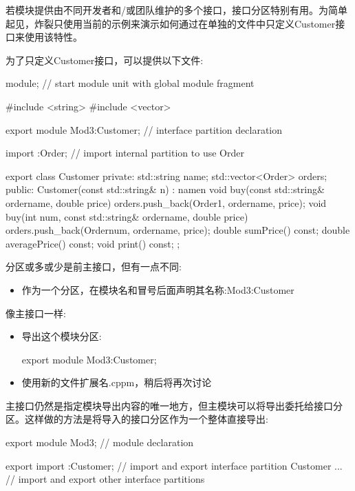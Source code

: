 若模块提供由不同开发者和/或团队维护的多个接口，接口分区特别有用。为简单起见，炸裂只使用当前的示例来演示如何通过在单独的文件中只定义Customer接口来使用该特性。

为了只定义Customer接口，可以提供以下文件:


\begin{cpp}
module; // start module unit with global module fragment

#include <string>
#include <vector>

export module Mod3:Customer; // interface partition declaration

import :Order; // import internal partition to use Order

export class Customer {
private:
	std::string name;
	std::vector<Order> orders;
public:
	Customer(const std::string& n)
	: name{n} {
	}
	void buy(const std::string& ordername, double price) {
		orders.push_back(Order{1, ordername, price});
	}
	void buy(int num, const std::string& ordername, double price) {
		orders.push_back(Order{num, ordername, price});
	}
	double sumPrice() const;
	double averagePrice() const;
	void print() const;
};
\end{cpp}

分区或多或少是前主接口，但有一点不同:

\begin{itemize}
\item 
作为一个分区，在模块名和冒号后面声明其名称:Mod3:Customer
\end{itemize}

像主接口一样:

\begin{itemize}
\item 
导出这个模块分区:

\begin{cpp}
export module Mod3:Customer;
\end{cpp}

\item 
使用新的文件扩展名.cppm，稍后将再次讨论
\end{itemize}

主接口仍然是指定模块导出内容的唯一地方，但主模块可以将导出委托给接口分区。这样做的方法是将导入的接口分区作为一个整体直接导出:


\begin{cpp}
export module Mod3; // module declaration

export import :Customer; // import and export interface partition Customer
... // import and export other interface partitions
\end{cpp}

